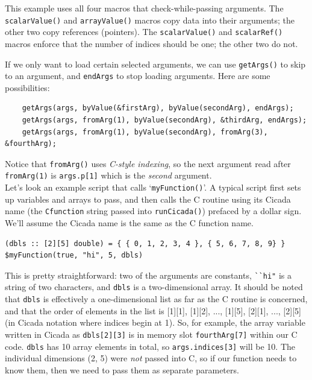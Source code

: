 \documentclass{article}
\newenvironment{code}{
       \begin{list}{}{
               \setlength{\leftmargin}{.4in}
               \setlength{\rightmargin}{0in}
               \setlength{\topsep}{.2in}
       }
       \small
       \item[] }
       { \end{list}   }
\begin{document}
\noindent This example uses all four macros that check-while-passing arguments.  The \verb#scalarValue()# and \verb#arrayValue()# macros copy data into their arguments; the other two copy references (pointers).  The \verb#scalarValue()# and \verb#scalarRef()# macros enforce that the number of indices should be one; the other two do not.

If we only want to load certain selected arguments, we can use \verb#getArgs()# to skip to an argument, and \verb#endArgs# to stop loading arguments.  Here are some possibilities:

\begin{code} \begin{verbatim}
    getArgs(args, byValue(&firstArg), byValue(secondArg), endArgs);
    getArgs(args, fromArg(1), byValue(secondArg), &thirdArg, endArgs);
    getArgs(args, fromArg(1), byValue(secondArg), fromArg(3), &fourthArg);
\end{verbatim} \end{code}

\noindent Notice that \verb#fromArg()# uses \emph{C-style indexing}, so the next argument read after \verb#fromArg(1)# is \verb#args.p[1]# which is the \emph{second} argument.\\

Let's look an example script that calls `\verb#myFunction()#'.  A typical script first sets up variables and arrays to pass, and then calls the C routine using its Cicada name (the \verb#Cfunction# string passed into \verb#runCicada()#) prefaced by a dollar sign.  We'll assume the Cicada name is the same as the C function name.

\begin{code} \begin{verbatim}
(dbls :: [2][5] double) = { { 0, 1, 2, 3, 4 }, { 5, 6, 7, 8, 9} }
$myFunction(true, "hi", 5, dbls)
\end{verbatim} \end{code}

\noindent This is pretty straightforward:  two of the arguments are constants, \verb#``hi"# is a string of two characters, and \verb#dbls# is a two-dimensional array.  It should be noted that \verb#dbls# is effectively a one-dimensional list as far as the C routine is concerned, and that the order of elements in the list is [1][1], [1][2], ..., [1][5], [2][1], ..., [2][5] (in Cicada notation where indices begin at 1).  So, for example, the array variable written in Cicada as \verb#dbls[2][3]# is in memory slot \verb#fourthArg[7]# within our C code.  \verb#dbls# has 10 array elements in total, so \verb#args.indices[3]# will be 10.  The individual dimensions (2, 5) were \emph{not} passed into C, so if our function needs to know them, then we need to pass them as separate parameters.
\end{document}
